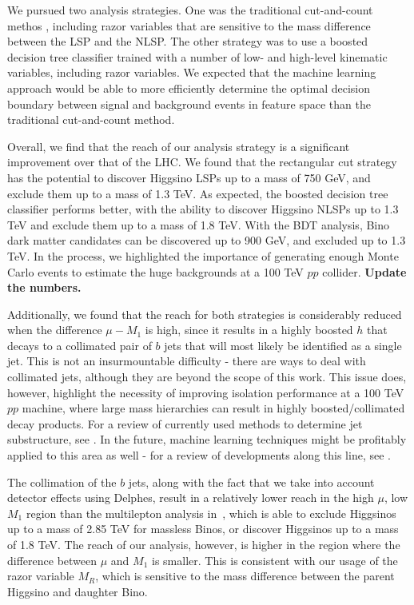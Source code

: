 \documentclass[a4paper,11pt]{article}
\newcommand{\Shufang}[1]{{\bf\color{Maroon}  #1}}
\begin{document}
We pursued two analysis strategies. One was the traditional cut-and-count methos , including razor variables
that are sensitive to the mass difference between the LSP and the NLSP. The
other strategy was to use a boosted decision tree classifier trained with a
number of low- and high-level kinematic variables, including razor variables. We expected
that the machine learning approach would be able to more efficiently determine
the optimal decision boundary between signal and background events in feature
space than the traditional   cut-and-count method.

Overall, we find that the reach of our analysis strategy is a significant
improvement over that of the LHC.    We found that the rectangular cut strategy has
the potential to discover Higgsino LSPs up to a mass of 750 GeV, and exclude
them up to a mass of 1.3 TeV. As expected, the boosted decision tree classifier
performs better, with the ability to discover Higgsino NLSPs up to 1.3 TeV and
exclude them up to a mass of 1.8 TeV. With the BDT analysis, Bino dark matter
candidates can be discovered up to 900 GeV, and excluded up to 1.3 TeV. In the
process, we highlighted the importance of generating enough Monte Carlo events
to estimate the huge backgrounds at a 100 TeV $pp$ collider.  \Shufang{Update the numbers.}

Additionally, we found that the reach for both strategies is considerably
reduced when the difference $ \mu-M_1$ is high, since it results in a highly
boosted $h$ that decays to a collimated pair of $b$ jets that will most likely be
identified as a single jet. This is not an insurmountable difficulty - there are
ways to deal with collimated jets, although they are beyond the scope of this
work. This issue does, however, highlight the necessity of improving isolation
performance at a 100 TeV $pp$ machine, where large mass hierarchies can result in
highly boosted/collimated decay products. For a review of currently used methods
to determine jet substructure, see \cite{Shelton:2013an}. In the future,
machine learning techniques might be profitably applied to this area as well -
for a review of developments along this line, see \cite{Schwartzman:2016jqu}. 

The collimation of the $b$ jets, along with the fact that we take into account
detector effects using Delphes, result in a relatively lower reach in the high $\mu$, low
$M_1$ region than the multilepton analysis in~\cite{Gori:2014oua}, which is
able to exclude Higgsinos up to a mass of 2.85 TeV for massless Binos, or discover Higgsinos up to a mass of 1.8 TeV.   The reach
of our analysis, however,  is higher in the region where the difference between
$\mu$ and $M_1$ is smaller. This is consistent with our usage of the razor
variable $M_R$, which is sensitive to the mass difference between the parent
Higgsino and daughter Bino.
\end{document}
